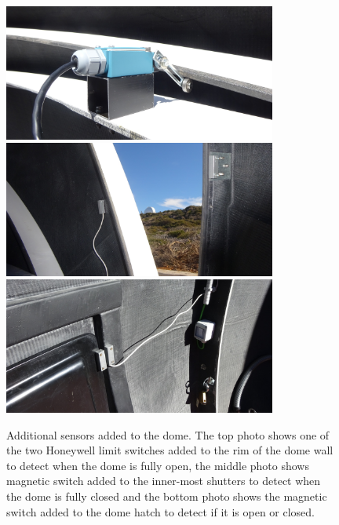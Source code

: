 \begin{colsection}
\begin{colsection}
\begin{figure}[p]
    \begin{center}
        \includegraphics[width=0.8\textwidth]{images/dome_sensor_1.jpg}
        \includegraphics[width=0.8\textwidth]{images/dome_sensor_2.jpg}
        \includegraphics[width=0.8\textwidth]{images/dome_sensor_3.jpg}
    \end{center}
    \caption[Additional sensors added to the dome]{
        Additional sensors added to the dome. The top photo shows one of the two Honeywell limit switches added to the rim of the dome wall to detect when the dome is fully open, the middle photo shows magnetic switch added to the inner-most shutters to detect when the dome is fully closed and the bottom photo shows the magnetic switch added to the dome hatch to detect if it is open or closed.
    }\label{fig:dome_switches}
\end{figure}


\end{colsection}
\end{colsection}
